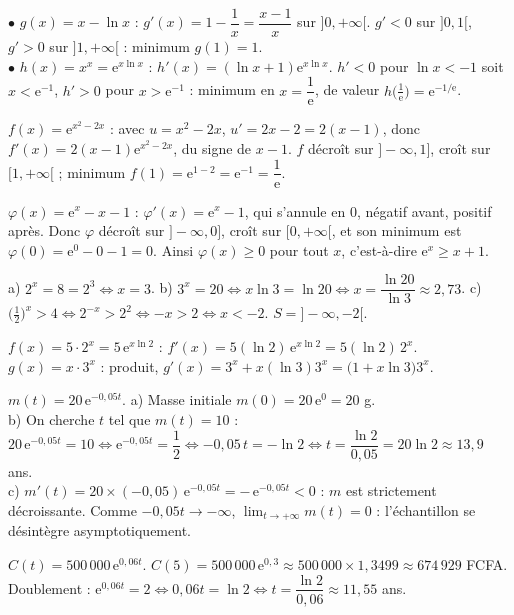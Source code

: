 $\bullet$ $g(x)=x-\ln x$ : $g'(x)=1-\dfrac1x=\dfrac{x-1}{x}$ sur $]0,+\infty[$. $g'<0$ sur
$]0,1[$, $g'>0$ sur $]1,+\infty[$ : minimum $g(1)=1$.\\
$\bullet$ $h(x)=x^{x}=\mathrm{e}^{x\ln x}$ : $h'(x)=(\ln x+1)\mathrm{e}^{x\ln x}$. $h'<0$ pour
$\ln x<-1$ soit $x<\mathrm{e}^{-1}$, $h'>0$ pour $x>\mathrm{e}^{-1}$ : minimum en
$x=\dfrac1{\mathrm{e}}$, de valeur $h\!\big(\tfrac1{\mathrm{e}}\big)=\mathrm{e}^{-1/\mathrm{e}}$.

$f(x)=\mathrm{e}^{x^{2}-2x}$ : avec $u=x^{2}-2x$, $u'=2x-2=2(x-1)$, donc
$f'(x)=2(x-1)\mathrm{e}^{x^{2}-2x}$, du signe de $x-1$. $f$ décroît sur $]-\infty,1]$, croît sur
$[1,+\infty[$ ; minimum $f(1)=\mathrm{e}^{1-2}=\mathrm{e}^{-1}=\dfrac1{\mathrm{e}}$.

$\varphi(x)=\mathrm{e}^{x}-x-1$ : $\varphi'(x)=\mathrm{e}^{x}-1$, qui s'annule en $0$, négatif
avant, positif après. Donc $\varphi$ décroît sur $]-\infty,0]$, croît sur $[0,+\infty[$, et son
minimum est $\varphi(0)=\mathrm{e}^{0}-0-1=0$. Ainsi $\varphi(x)\ge0$ pour tout $x$, c'est-à-dire
$\mathrm{e}^{x}\ge x+1$.

a) $2^{x}=8=2^{3}\iff x=3$. \quad
b) $3^{x}=20\iff x\ln3=\ln20\iff x=\dfrac{\ln20}{\ln3}\approx2{,}73$. \quad
c) $\big(\tfrac12\big)^{x}>4\iff 2^{-x}>2^{2}\iff -x>2\iff x<-2$. \;$S=]-\infty,-2[$.

$f(x)=5\cdot2^{x}=5\,\mathrm{e}^{x\ln2}$ : $f'(x)=5(\ln2)\,\mathrm{e}^{x\ln2}=5(\ln2)\,2^{x}$.\\
$g(x)=x\cdot3^{x}$ : produit, $g'(x)=3^{x}+x(\ln3)3^{x}=\big(1+x\ln3\big)3^{x}$.

$m(t)=20\,\mathrm{e}^{-0{,}05t}$.
a) Masse initiale $m(0)=20\,\mathrm{e}^{0}=20$ g.\\
b) On cherche $t$ tel que $m(t)=10$ :
$20\,\mathrm{e}^{-0{,}05t}=10\iff\mathrm{e}^{-0{,}05t}=\dfrac12
\iff -0{,}05\,t=-\ln 2\iff t=\dfrac{\ln 2}{0{,}05}=20\ln 2\approx 13{,}9$ ans.\\
c) $m'(t)=20\times(-0{,}05)\,\mathrm{e}^{-0{,}05t}=-\,\mathrm{e}^{-0{,}05t}<0$ : $m$ est strictement
décroissante. Comme $-0{,}05t\to-\infty$, $\displaystyle\lim_{t\to+\infty}m(t)=0$ : l'échantillon
se désintègre asymptotiquement.

$C(t)=500\,000\,\mathrm{e}^{0{,}06t}$.
$C(5)=500\,000\,\mathrm{e}^{0{,}3}\approx500\,000\times1{,}3499\approx674\,929$ FCFA.
Doublement : $\mathrm{e}^{0{,}06t}=2\iff0{,}06t=\ln2\iff t=\dfrac{\ln2}{0{,}06}\approx11{,}55$ ans.

